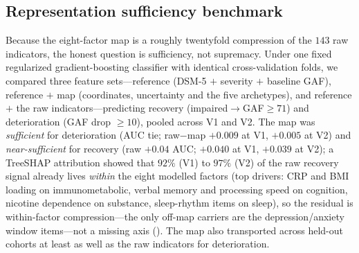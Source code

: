 \subsection{Representation sufficiency benchmark}

Because the eight-factor map is a roughly twentyfold compression of the $143$ raw
indicators, the honest question is sufficiency, not supremacy. Under one fixed
regularized gradient-boosting classifier with identical cross-validation folds, we
compared three feature sets---reference (DSM-5 $+$ severity $+$ baseline GAF),
reference $+$ map (coordinates, uncertainty and the five archetypes), and reference $+$
the raw indicators---predicting recovery (impaired$\to$GAF$\ge71$) and deterioration
(GAF drop $\ge10$), pooled across V1 and V2. The map was \emph{sufficient} for
deterioration (AUC tie; raw$-$map $+0.009$ at V1, $+0.005$ at V2) and
\emph{near-sufficient} for recovery (raw $+0.04$ AUC; $+0.040$ at V1, $+0.039$ at V2);
a TreeSHAP attribution showed that $92\%$ (V1) to $97\%$ (V2) of the raw recovery signal
already lives \emph{within} the eight modelled factors (top drivers: CRP and BMI loading
on immunometabolic, verbal memory and processing speed on cognition, nicotine dependence
on substance, sleep-rhythm items on sleep), so the residual is within-factor
compression---the only off-map carriers are the depression/anxiety window items---not a
missing axis (). The map also transported across held-out cohorts at
least as well as the raw indicators for deterioration.

